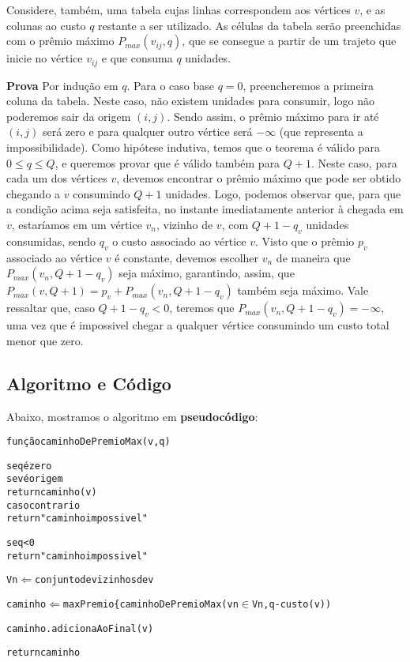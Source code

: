 \documentclass[a4paper]{article}
\begin{document}
Considere, também, uma tabela cujas linhas correspondem aos vértices $v$, e as colunas ao custo $q$ restante a ser utilizado. As células da tabela serão preenchidas com o prêmio máximo $P_{max}(v_{ij},q)$, que se consegue a partir de um trajeto que inicie no vértice $v_{ij}$ e que consuma $q$ unidades.

\noindent
\textbf{Prova} \:
Por indução em $q$. Para o caso base $q = 0$, preencheremos a primeira coluna da tabela. Neste caso, não existem unidades para consumir, logo não poderemos sair da origem $(i,j)$. Sendo assim, o prêmio máximo para ir até $(i,j)$ será zero e para qualquer outro vértice será $-\infty$ (que representa a impossibilidade).
Como hipótese indutiva, temos que o teorema é válido para $0 \leq q \leq Q$, e queremos provar que é válido também para $Q+1$. Neste caso, para cada um dos vértices $v$, devemos encontrar o prêmio máximo que pode ser obtido chegando a $v$ consumindo $Q+1$ unidades. Logo, podemos observar que, para que a condição acima seja satisfeita, no instante imediatamente anterior à chegada em $v$, estaríamos em um vértice $v_n$, vizinho de $v$, com $Q+1-q_v$ unidades consumidas, sendo $q_v$ o custo associado ao vértice $v$. Visto que o prêmio $p_v$ associado ao vértice $v$ é constante, devemos escolher $v_n$ de maneira que $P_{max}(v_n,Q+1-q_v)$ seja máximo, garantindo, assim, que $P_{max}(v,Q+1) = p_v + P_{max}(v_n,Q+1-q_v)$ também seja máximo. Vale ressaltar que, caso $Q+1-q_v < 0$, teremos que $P_{max}(v_n,Q+1-q_v) = -\infty$, uma vez que é impossivel chegar a qualquer vértice consumindo um custo total menor que zero.


\subsection*{Algoritmo e Código}

Abaixo, mostramos o algoritmo em \textbf{pseudocódigo}:

{\color{ogreen}
\begin{alltt}
função caminhoDePremioMax(v, q)

    se q é zero
        se v é origem
            return caminho({v})
        caso contrario
            return "caminho impossivel"

    se q < 0
        return "caminho impossivel"

    Vn \(\Leftarrow\) conjunto de vizinhos de v

    caminho \(\Leftarrow\) maxPremio\{ caminhoDePremioMax( vn \(\in\) Vn, q-custo(v) )

    caminho.adicionaAoFinal(v)

    return caminho

\end{alltt}
}
\end{document}
